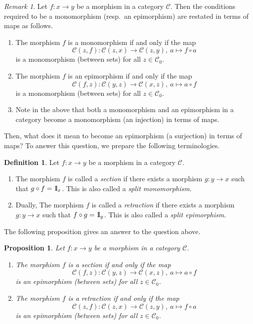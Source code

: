 \documentclass{surv-l}
\numberwithin{equation}{chapter}
\numberwithin{figure}{chapter}
\theoremstyle{plain}
\newtheorem{prp}[thm]{Proposition}
\theoremstyle{definition}
\newtheorem{dfn}[thm]{Definition}
\theoremstyle{remark}
\newtheorem{rmk}[thm]{Remark}
\newcommand{\id}{1\kern-.25em{\text{{\rm l}}}}
\begin{document}
\begin{rmk}\label{rmk:mon-epi-Hom}
Let $f \colon x \to y$ be a morphism in a category ${\mathcal{C}}$.
Then the conditions required to be a monomorphism (resp.\ an epimorphism) are restated
in terms of maps as follows.

\begin{enumerate}
\item
The morphism $f$ is a monomorphism if and only if the map
\[
{\mathcal{C}}(z, f) \colon {\mathcal{C}}(z, x) \to {\mathcal{C}}(z, y), \ a \mapsto f \circ a
\]
is a monomorphism (between sets) for all $z \in {\mathcal{C}}_0$.
\item
The morphism $f$ is an epimorphism if and only if the map
\[
{\mathcal{C}}(f, z) \colon {\mathcal{C}}(y, z) \to {\mathcal{C}}(x, z), \ a \mapsto a \circ f
\]
is a monomorphism (between sets) for all $z \in {\mathcal{C}}_0$.
\item
Note in the above that both a monomorphism and an epimorphism in a category
become a monomorphism (an injection) in terms of maps.
\end{enumerate}
\end{rmk}

Then, what does it mean to become an epimorphism (a surjection) in terms of maps?
To answer this question, we prepare the following terminologies.
\begin{dfn}
Let $f \colon x \to y$ be a morphism in a category ${\mathcal{C}}$.
\begin{enumerate}
\item
The morphism $f$ is called a \emph{section} if
there exists a morphism $g \colon y \to x$ such that $g \circ f = \id_x$.
This is also called a \emph{split monomorphism}.
\item
Dually, The morphism $f$ is called a \emph{retraction} if
there exists a morphism $g \colon y \to x$ such that $f \circ g = \id_y$.
This is also called a \emph{split epimorphism}.
\end{enumerate}
\end{dfn}

The following proposition gives an answer to the question above.

\begin{prp}\label{prp:sect-retr-Hom-epi}
Let $f \colon x \to y$ be a morphism in a category ${\mathcal{C}}$.
\begin{enumerate}
\item
The morphism $f$ is a section if and only if the map
\[
{\mathcal{C}}(f, z) \colon {\mathcal{C}}(y, z) \to {\mathcal{C}}(x, z), \ a \mapsto a \circ f
\]
is an epimorphism (between sets) for all $z \in {\mathcal{C}}_0$.
\item
The morphism $f$ is a retraction if and only if the map
\[
{\mathcal{C}}(z, f) \colon {\mathcal{C}}(z, x) \to {\mathcal{C}}(z, y), \ a \mapsto f \circ a
\]
is an epimorphism (between sets) for all $z \in {\mathcal{C}}_0$.
\end{enumerate}
\end{prp}
\end{document}
